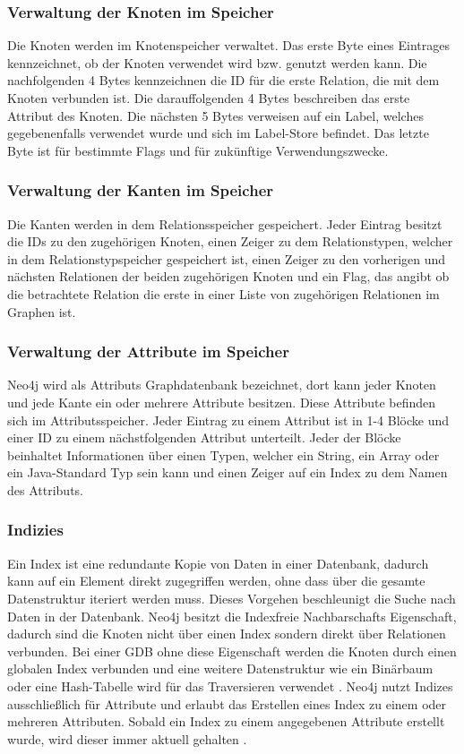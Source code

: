 \subsubsection{Verwaltung der Knoten im Speicher}
 Die Knoten werden im Knotenspeicher verwaltet. Das erste Byte eines Eintrages kennzeichnet, ob der Knoten verwendet wird bzw. genutzt werden kann. Die nachfolgenden 4 Bytes kennzeichnen die ID für die erste Relation, die mit dem Knoten verbunden ist. Die darauffolgenden 4 Bytes beschreiben das erste Attribut des Knoten. Die nächsten 5 Bytes verweisen auf ein Label, welches gegebenenfalls verwendet wurde und sich im Label-Store befindet. Das letzte Byte ist für bestimmte Flags und für zukünftige Verwendungszwecke. 
\subsubsection{Verwaltung der Kanten im Speicher}
Die Kanten werden in dem Relationsspeicher gespeichert. Jeder Eintrag besitzt die IDs zu den zugehörigen Knoten, einen Zeiger zu dem Relationstypen, welcher in dem Relationstypspeicher gespeichert ist, einen Zeiger zu den vorherigen und nächsten Relationen der beiden zugehörigen Knoten und ein Flag, das angibt ob die betrachtete Relation die erste in einer Liste von zugehörigen Relationen im Graphen ist. 
\subsubsection{Verwaltung der Attribute im Speicher}
Neo4j wird als Attributs Graphdatenbank bezeichnet, dort kann jeder Knoten und jede Kante  ein oder mehrere Attribute besitzen. Diese Attribute befinden sich im Attributsspeicher. Jeder Eintrag zu einem Attribut ist in 1-4 Blöcke und einer ID zu einem nächstfolgenden Attribut unterteilt. Jeder der Blöcke beinhaltet Informationen über einen Typen, welcher ein String, ein Array oder ein Java-Standard Typ sein kann und einen Zeiger auf ein Index zu dem Namen des Attributs.  
\subsubsection{Indizies}
Ein Index ist eine redundante Kopie von Daten in einer Datenbank, dadurch kann auf ein Element direkt zugegriffen werden, ohne dass über die gesamte Datenstruktur iteriert werden muss. Dieses Vorgehen beschleunigt die Suche nach Daten in der Datenbank. Neo4j besitzt die Indexfreie Nachbarschafts Eigenschaft, dadurch sind die Knoten nicht über einen Index  sondern direkt über Relationen verbunden. Bei einer GDB ohne diese Eigenschaft werden die Knoten durch einen globalen Index verbunden und eine weitere Datenstruktur  wie ein Binärbaum oder eine Hash-Tabelle wird für das Traversieren verwendet \parencite{robinson2013graph}. \newline
Neo4j nutzt Indizes ausschließlich für Attribute und erlaubt das Erstellen eines Index zu einem oder mehreren Attributen. Sobald ein Index zu einem angegebenen Attribute erstellt wurde, wird dieser immer aktuell gehalten \parencite{Index}.  	

